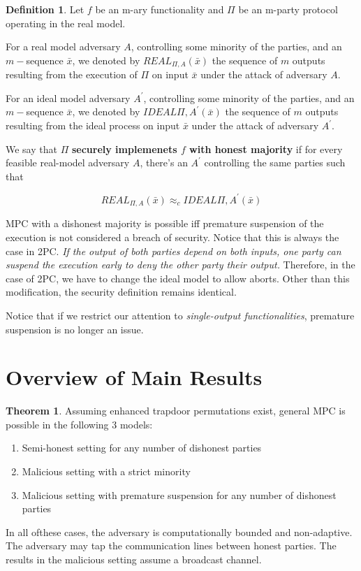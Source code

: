 \documentclass{article}
\theoremstyle{definition}
\newtheorem{definition}{Definition}
\newtheorem{theorem}{Theorem}[section]
\begin{document}
\begin{definition}
    Let $f$ be an m-ary functionality and $\Pi$ be an m-party
    protocol operating in the real model.

    For a real model adversary $A$, controlling some minority of the parties,
    and an $m-$sequence $\bar{x}$, we denoted by $REAL_{\Pi,A}(\bar{x})$ the
    sequence of $m$ outputs resulting from the execution of $\Pi$ on input $\bar{x}$
    under the attack of adversary $A$.

    For an ideal model adversary $A^{\prime}$, controlling some minority of the parties,
    and an $m-$sequence $\bar{x}$, we denoted by $IDEAL{\Pi,A^{\prime}}(\bar{x})$ the
    sequence of $m$ outputs resulting from the ideal process on input $\bar{x}$
    under the attack of adversary $A^{\prime}$.

    We say that $\Pi$ \textbf{securely implemenets $f$ with honest majority} if for
    every feasible real-model adversary $A$, there's an $A^{\prime}$ controlling the same
    parties such that

    \[ REAL_{\Pi,A}(\bar{x}) \approx_{c} IDEAL{\Pi,A^{\prime}}(\bar{x}) \]
\end{definition}

MPC with a dishonest majority is possible iff premature suspension of the execution
is not considered a breach of security. Notice that this is always the case in
2PC. \textit{If the output of both parties depend on both inputs, one party 
can suspend the execution early to deny the other party their output.} Therefore,
in the case of 2PC, we have to change the ideal model to allow aborts. Other than this
modification, the security definition remains identical.

Notice that if we restrict our attention to \textit{single-output functionalities},
premature suspension is no longer an issue.

\newpage

\section{Overview of Main Results}

\begin{theorem}
    Assuming enhanced trapdoor permutations exist, general MPC is possible in the following 3 models:

    \begin{enumerate}
        \item Semi-honest setting for any number of dishonest parties
        \item Malicious setting with a strict minority
        \item Malicious setting with premature suspension for any number of dishonest parties
    \end{enumerate}

    In all ofthese cases, the adversary is computationally bounded and non-adaptive. The adversary
    may tap the communication lines between honest parties. The results in the malicious setting assume
    a broadcast channel.
\end{theorem}
\end{document}
